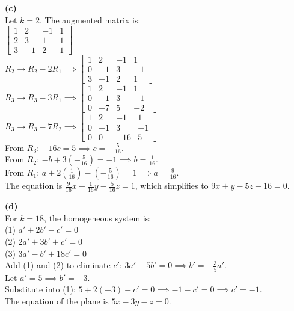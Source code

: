 \begin{solution}
\medskip
\textbf{(c)} \\
Let $k = 2$. The augmented matrix is: \\
$\left[\begin{array}{ccc|c} 1 & 2 & -1 & 1 \\ 2 & 3 & 1 & 1 \\ 3 & -1 & 2 & 1 \end{array}\right]$ \\
$R_2 \to R_2 - 2R_1 \implies \left[\begin{array}{ccc|c} 1 & 2 & -1 & 1 \\ 0 & -1 & 3 & -1 \\ 3 & -1 & 2 & 1 \end{array}\right]$ \\
$R_3 \to R_3 - 3R_1 \implies \left[\begin{array}{ccc|c} 1 & 2 & -1 & 1 \\ 0 & -1 & 3 & -1 \\ 0 & -7 & 5 & -2 \end{array}\right]$ \\
$R_3 \to R_3 - 7R_2 \implies \left[\begin{array}{ccc|c} 1 & 2 & -1 & 1 \\ 0 & -1 & 3 & -1 \\ 0 & 0 & -16 & 5 \end{array}\right]$ \\
From $R_3$: $-16c = 5 \implies c = -\frac{5}{16}$. \\
From $R_2$: $-b + 3(-\frac{5}{16}) = -1 \implies b = \frac{1}{16}$. \\
From $R_1$: $a + 2(\frac{1}{16}) - (-\frac{5}{16}) = 1 \implies a = \frac{9}{16}$. \\
The equation is $\frac{9}{16}x + \frac{1}{16}y - \frac{5}{16}z = 1$, which simplifies to $9x + y - 5z - 16 = 0$.

\medskip
\textbf{(d)} \\
For $k = 18$, the homogeneous system is: \\
(1) $a' + 2b' - c' = 0$ \\
(2) $2a' + 3b' + c' = 0$ \\
(3) $3a' - b' + 18c' = 0$ \\
Add (1) and (2) to eliminate $c'$: $3a' + 5b' = 0 \implies b' = -\frac{3}{5}a'$. \\
Let $a' = 5 \implies b' = -3$. \\
Substitute into (1): $5 + 2(-3) - c' = 0 \implies -1 - c' = 0 \implies c' = -1$. \\
The equation of the plane is $5x - 3y - z = 0$.
\end{solution}

